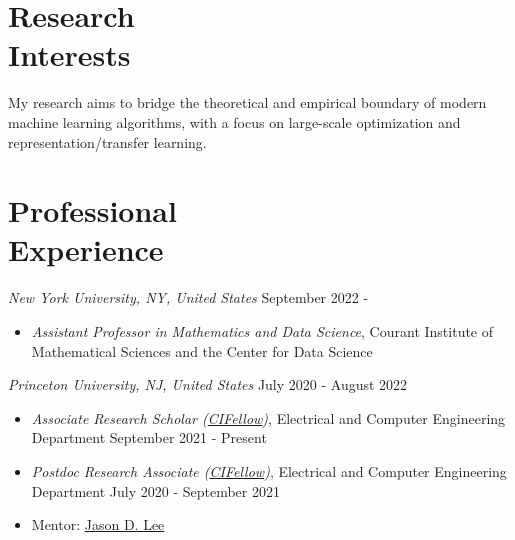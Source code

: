 \documentclass[margin, 10pt]{res} %
\begin{document}
\begin{resume}
\section{Research\\ Interests}
My research aims to bridge the theoretical and empirical boundary of modern machine learning algorithms, with a focus on large-scale optimization and representation/transfer learning. 
\begin{comment} 
\textbf{Large-scale optimization:}
\begin{itemize}
	\item Efficient and scalable optimization algorithm design: exploiting problem's underlying structure
	\item Two-player games: customized adversarial robustness and generative adversarial network training 
	\item Distributed systems: gradient coding and asynchronous distributed learning 
\end{itemize}
\textbf{Representation Learning and Transfer Learning}
\begin{itemize}
\item Statistical learning theory of representation with supervised pretraining, fine-tuning and self-supervised learning
\item Application to meta-reinforcement learning 
\end{itemize}
Applications:
\begin{itemize}
	\item Inverse problems with generative models
\end{itemize}
\end{comment} 

\section{Professional\\Experience}
{\sl New York University, NY, United States} \hfill September 2022 - 
\begin{itemize}
	\item {\sl Assistant Professor in Mathematics and Data Science},  Courant Institute of Mathematical Sciences and the Center for Data Science 
\end{itemize} 

{\sl Princeton University, NJ, United States} \hfill July 2020 - August 2022
\begin{itemize}
	\item {\sl Associate Research Scholar (\href{https://cifellows2020.org/}{CIFellow})}, Electrical and Computer Engineering Department \hfill September 2021 - Present 
	\item {\sl Postdoc Research Associate (\href{https://cifellows2020.org/}{CIFellow})}, Electrical and Computer Engineering Department \hfill July 2020 - September 2021 
	\item Mentor: \href{https://jasondlee88.github.io/}{Jason D. Lee}
\end{itemize}



\end{resume}
\end{document}
